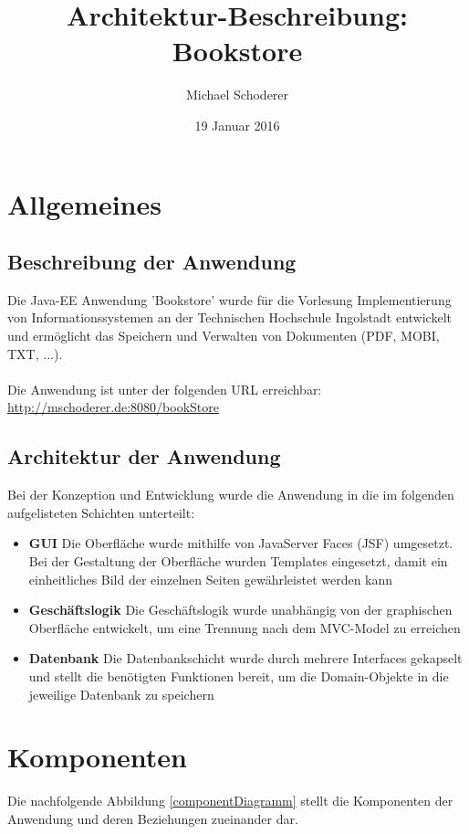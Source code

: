 \documentclass[12pt,a4paper]{book}
\author{Michael Schoderer}
\title{Architektur-Beschreibung: Bookstore}
\date{19 Januar 2016}
\begin{document}
	\maketitle	
	\begin{minipage}{\textwidth}
		\vfill
		\tableofcontents
			\listoffigures
	\end{minipage}

	
	
	
	\chapter{Allgemeines}
	\section{Beschreibung der Anwendung}
	Die Java-EE Anwendung 'Bookstore' wurde für die Vorlesung Implementierung von Informationssystemen an der Technischen Hochschule Ingolstadt entwickelt und ermöglicht das Speichern und Verwalten von Dokumenten (PDF, MOBI, TXT, ...).\\
	\\
	Die Anwendung ist unter der folgenden URL erreichbar: \url{http://mschoderer.de:8080/bookStore}
	
	\section{Architektur der Anwendung}
	Bei der Konzeption und Entwicklung wurde die Anwendung in die im folgenden aufgelisteten Schichten unterteilt:
	\begin{itemize}
		\item \textbf{GUI} Die Oberfläche wurde mithilfe von JavaServer Faces (JSF) umgesetzt. Bei der Gestaltung der Oberfläche wurden Templates eingesetzt, damit ein einheitliches Bild der einzelnen Seiten gewährleistet werden kann
		\item \textbf{Geschäftslogik} Die Geschäftslogik wurde unabhängig von der graphischen Oberfläche entwickelt, um eine Trennung nach dem MVC-Model zu erreichen
		\item \textbf{Datenbank} Die Datenbankschicht wurde durch mehrere Interfaces gekapselt und stellt die benötigten Funktionen bereit, um die Domain-Objekte in die jeweilige Datenbank zu speichern		
		\end{itemize}	
		
		\let\cleardoublepage\clearpage
	\chapter{Komponenten}
	Die nachfolgende Abbildung \ref{componentDiagramm} stellt die Komponenten der Anwendung und deren Beziehungen zueinander dar.
	
\end{document}
